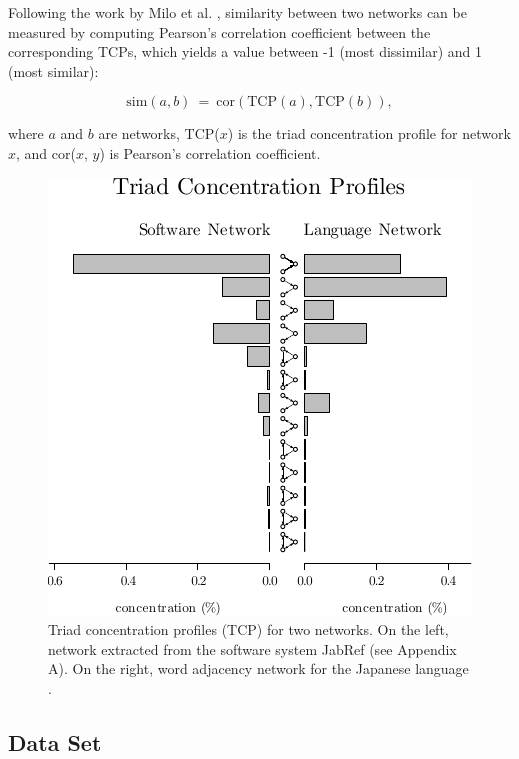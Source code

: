 Following the work by Milo et al. \cite{Milo2004}, similarity between two
networks can be measured by computing Pearson's correlation coefficient between
the corresponding TCPs, which yields a value between -1 (most dissimilar) and 1
(most similar):

$$
\mathrm{sim}(a, b) ~=~ \mathrm{cor}(\mathrm{TCP}(a), \mathrm{TCP}(b))\mathrm{,}
$$

where $a$ and $b$ are networks, TCP($x$) is the triad concentration profile for
network $x$, and cor($x$, $y$) is Pearson's correlation coefficient.



\begin{figure}[!t]
\center
\includegraphics{tcp}

\caption{Triad concentration profiles (TCP) for two networks. On the left,
network extracted from the software system JabRef (see Appendix A). On the
right, word adjacency network for the Japanese language \cite{Milo2004}.}
\label{fig:profiles}
\end{figure}

\subsection{Data Set}

